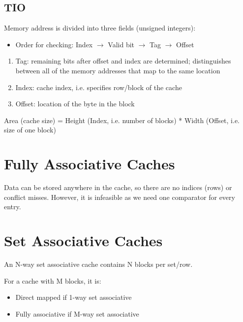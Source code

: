 \subsection{TIO}
Memory address is divided into three fields (unsigned integers):
\begin{itemize}
    \item Order for checking: Index $\rightarrow$ Valid bit $\rightarrow$ Tag $\rightarrow$ Offset
\end{itemize}
\begin{enumerate}
    \item Tag: remaining bits after offset and index are determined; distinguishes between all of the memory addresses that map to the same location
    \item Index: cache index, i.e. specifies row/block of the cache
    \item Offset: location of the byte in the block
\end{enumerate}

Area (cache size) = Height (Index, i.e. number of blocks) * Width (Offset, i.e. size of one block)

\section{Fully Associative Caches}
Data can be stored anywhere in the cache, so there are no indices (rows) or conflict misses. However, it is infeasible as we need one comparator for every entry.

\section{Set Associative Caches}
An N-way set associative cache contains N blocks per set/row.

For a cache with M blocks, it is:
\begin{itemize}
    \item Direct mapped if 1-way set associative
    \item Fully associative if M-way set associative
\end{itemize}

